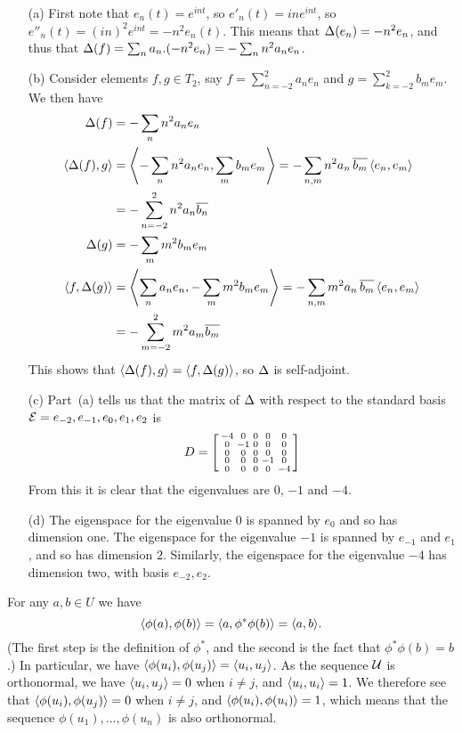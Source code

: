 \begin{itemize}
  \item[(a)]
   First note that $e_n(t)=e^{int}$, so $e'_n(t)=ine^{int}$, so
   $e''_n(t)=(in)^2e^{int}=-n^2e_n(t)$.  This means that
   $\Delta(e_n)=-n^2e_n$, and thus that
   $\Delta(f)=\sum_n a_n.(-n^2e_n)=-\sum_n n^2 a_n e_n$.
  \item[(b)]
   Consider elements $f,g\in T_2$, say $f=\sum_{n=-2}^2a_ne_n$ and
   $g=\sum_{k=-2}^2b_me_m$.  We then have
   \begin{align*}
    \Delta(f) &= -\sum_n n^2 a_n e_n \\
    \langle \Delta(f),g\rangle &=
     \left\langle -\sum_n n^2a_ne_n,\sum_m b_me_m\right\rangle
      = -\sum_{n,m} n^2 a_n\,\overline{b_m}\,\langle e_n,e_m\rangle \\
    &= -\sum_{n=-2}^2 n^2 a_n \overline{b_n} \\
    \Delta(g) &= -\sum_m m^2 b_m e_m \\
    \langle f,\Delta(g)\rangle &=
     \left\langle\sum_n a_ne_n,-\sum_m m^2b_me_m\right\rangle
      = -\sum_{n,m} m^2 a_n\,\overline{b_m}\,\langle e_n,e_m\rangle \\
    &= -\sum_{m=-2}^2 m^2 a_m \overline{b_m}
   \end{align*}
   This shows that $\langle \Delta(f),g\rangle=\langle f,\Delta(g)\rangle$, so $\Delta$ is
   self-adjoint.
  \item[(c)] Part~(a) tells us that the matrix of $\Delta$ with respect
   to the standard basis ${\mathcal{E}}=e_{-2},e_{-1},e_0,e_1,e_2$ is
   {\tiny \[
     D = \left[\begin{smallmatrix} -4 &  0 & 0 &  0 &  0 \\
               0 & -1 & 0 &  0 &  0 \\
               0 &  0 & 0 &  0 &  0 \\
               0 &  0 & 0 & -1 &  0 \\
               0 &  0 & 0 &  0 & -4 \end{smallmatrix}\right]
   \]}
   From this it is clear that the eigenvalues are $0$, $-1$ and $-4$.
  \item[(d)] The eigenspace for the eigenvalue $0$ is spanned by $e_0$
   and so has dimension one.  The eigenspace for the eigenvalue $-1$ is
   spanned by $e_{-1}$ and $e_1$, and so has dimension $2$.
   Similarly, the eigenspace for the eigenvalue $-4$ has dimension two,
   with basis $e_{-2},e_2$.
 \end{itemize}
\EndDeferredSolution

 For any $a,b\in U$ we have
 \[ \langle \phi(a),\phi(b)\rangle=\langle a,\phi^*\phi(b)\rangle=\langle a,b\rangle. \]
 (The first step is the definition of $\phi^*$, and the
 second is the fact that $\phi^*\phi(b)=b$.)  In particular,
 we have $\langle \phi(u_i),\phi(u_j)\rangle=\langle u_i,u_j\rangle$.  As the
 sequence ${\mathcal{U}}$ is orthonormal, we have $\langle u_i,u_j\rangle=0$
 when $i\neq j$, and $\langle u_i,u_i\rangle=1$.  We therefore see
 that $\langle \phi(u_i),\phi(u_j)\rangle=0$ when $i\neq j$, and
 $\langle \phi(u_i),\phi(u_i)\rangle=1$, which means that the sequence
 $\phi(u_1),\dotsc,\phi(u_n)$ is also orthonormal.
\EndDeferredSolution

